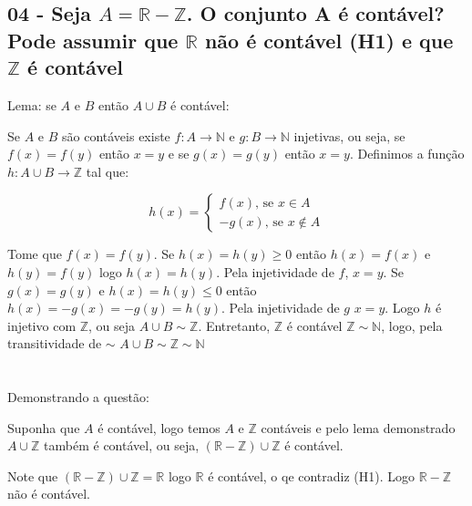 \subsection*{
04 - Seja $ A = \mathbb{R} - \mathbb{Z} $. O conjunto A é contável?
\\
Pode assumir que $\mathbb{R}$ não é contável (H1) e que $ \mathbb{Z} $ é contável
}

Lema: se $ A $ e $ B $ então $ A \cup B $ é contável:

Se $ A $ e $ B $ são contáveis existe $ f \colon A \to \mathbb{N} $ e $ g \colon B \to \mathbb{N} $ injetivas, ou seja, se $ f(x) = f(y) $ então $ x = y $ e se $ g(x) = g(y) $ então $ x = y $. Definimos a função $ h \colon A \cup B \to \mathbb{Z} $ tal que:

\[   
h(x) = 
\begin{cases}
	f(x) \text{, se } x \in A \\
	-g(x) \text{, se } x \notin A
\end{cases}
\]

Tome que $ f(x) = f(y) $. Se $ h(x) = h(y) \geq 0 $ então $ h(x) = f(x) $ e $ h(y) = f(y) $ logo $ h(x) = h(y) $. Pela injetividade de $ f $, $ x = y $. Se $ g(x) = g(y) $ e $ h(x) = h(y) \leq 0 $ então $ h(x) = -g(x) = -g(y) = h(y) $. Pela injetividade de $ g $ $ x = y $. Logo $ h $ é injetivo com $ \mathbb{Z} $, ou seja $ A \cup B \sim \mathbb{Z} $. Entretanto, $ \mathbb{Z} $ é contável $ \mathbb{Z} \sim \mathbb{N} $, logo, pela transitividade de $ \sim $ $ A \cup B \sim \mathbb{Z} \sim \mathbb{N} $
\\~\\~\\
Demonstrando a questão:

Suponha que $ A $ é contável, logo temos $ A $ e $ \mathbb{Z} $ contáveis e pelo lema demonstrado $ A \cup \mathbb{Z} $ também é contável, ou seja, $ (\mathbb{R} - \mathbb{Z}) \cup \mathbb{Z} $ é contável.

Note que $ (\mathbb{R} - \mathbb{Z}) \cup \mathbb{Z} = \mathbb{R} $ logo $ \mathbb{R} $ é contável, o qe contradiz (H1). Logo $ \mathbb{R} - \mathbb{Z} $ não é contável. 
